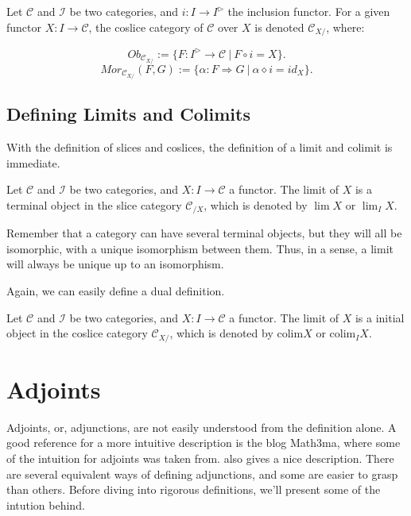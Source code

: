 \begin{definition}
	Let $\mathcal C$ and $\mathcal I$ be two categories, and $i:I \to I^{\rhd}$ the
	inclusion functor. For a given functor $X:I \to \mathcal C$, the coslice category
	of $\mathcal C$ over $X$ is denoted $\mathcal C_{X/}$, where:

	\begin{displaymath}
		Ob_{\mathcal C_{X/}}:=\{
		F: I^\rhd \to \mathcal C \ | \ F \circ i = X
		\}.
	\end{displaymath}
	\begin{displaymath}
		Mor_{\mathcal C_{X/}}(F,G):=\{
		\alpha: F \Rightarrow G \ | \ \alpha \diamond i = id_{X}
		\}.
	\end{displaymath}
\end{definition}

\subsection{Defining Limits and Colimits}

With the definition of slices and coslices, the definition of a limit and
colimit is immediate.
\begin{definition}[Limit]
	Let $\mathcal C$ and $\mathcal I$ be two categories, and $X:I \to \mathcal C$
	a functor. The limit of $X$ is a terminal object in the slice category
	$\mathcal C_{/X}$, which is denoted by $\lim X$ or $\lim_I X$.
\end{definition}

Remember that a category can have several terminal objects, but they will all
be isomorphic, with a unique isomorphism between them. Thus, in a sense, a limit
will always be unique up to an isomorphism.

Again, we can easily define a dual definition.

\begin{definition}[Colimit]
	Let $\mathcal C$ and $\mathcal I$ be two categories, and $X:I \to \mathcal C$
	a functor. The limit of $X$ is a initial object in the coslice category
	$\mathcal C_{X/}$, which is denoted by $\text{colim} X$ or $\text{colim}_I X$.
\end{definition}


\section{Adjoints}

Adjoints, or, adjunctions, are not easily understood from the definition alone.
A good reference for a more intuitive description is the blog Math3ma, where some of the
intuition for adjoints was taken from. \citet{leinster2014basic} also gives a nice description.
There are several equivalent ways of defining adjunctions, and some are easier to grasp
than others. Before diving into rigorous definitions, we'll present some of the
intution behind.

